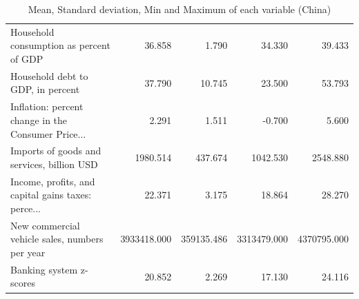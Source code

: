 \documentclass[11pt]{article}
\begin{document}
\begin{table}[H]
{\begin{tabular}{lrrrr}
Household consumption as percent of GDP            &       36.858 &       1.790 &       34.330 &       39.433 \\
Household debt to GDP, in percent                  &       37.790 &      10.745 &       23.500 &       53.793 \\
Inflation: percent change in the Consumer Price... &        2.291 &       1.511 &       -0.700 &        5.600 \\
Imports of goods and services, billion USD         &     1980.514 &     437.674 &     1042.530 &     2548.880 \\
Income, profits, and capital gains taxes: perce... &       22.371 &       3.175 &       18.864 &       28.270 \\
New commercial vehicle sales, numbers per year     &  3933418.000 &  359135.486 &  3313479.000 &  4370795.000 \\
Banking system z-scores                            &       20.852 &       2.269 &       17.130 &       24.116 \\
\bottomrule
\end{tabular}}
\caption{Mean, Standard deviation, Min and Maximum of each variable (China)}
\label{tab:describe_chn}
\end{table}
\end{document}
